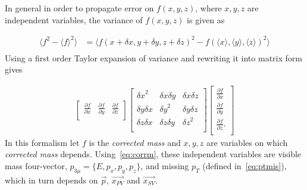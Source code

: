 In general in order to propagate error on $f(x,y,z)$, where $x,y,z$ are independent variables, the variance of $f(x,y,z)$ is given as

\begin{equation}
\begin{aligned}
	\langle f^{2}-\langle f \rangle^{2} \rangle  &=  \langle f(x+\delta x, y+\delta y, z+\delta z)^{2} - f(\langle x \rangle, \langle y \rangle, \langle z \rangle)^{2} \rangle \\
\end{aligned}
\end{equation}
Using a first order Taylor expansion of variance and rewriting it into matrix form gives

\begin{equation}
\begin{aligned}
       \begin{bmatrix}
		\frac{\partial{f}}{\partial{x}} & \frac{\partial{f}}{\partial{y}} & \frac{\partial{f}}{\partial{z}} \\
       \end{bmatrix}
       \begin{bmatrix}
	       {\delta x}^{2} & \delta x \delta y & \delta x \delta z  \\ 
	        \delta y \delta x & {\delta y}^{2} & \delta y \delta z  \\
	        \delta z \delta x & \delta z \delta y & {\delta z}^{2}  \\
       \end{bmatrix}
       \begin{bmatrix}
		\frac{\partial{f}}{\partial{x}} \\ \frac{\partial{f}}{\partial{y}} \\\frac{\partial{f}}{\partial{z}}. \\
       \end{bmatrix}
\end{aligned}
\end{equation}
In this formalism let $f$ is the \emph{corrected mass} and $x,y,z$ are variables on which \emph{corrected mass} depends. Using~\autoref{eq:corrm}, these independent variables are visible mass four-vector, $p_{3\mu}=\{E,p_{x},p_{y},p_{z}\}$, and missing $p_{T}$ (defined in~\autoref{eq:ptmis}), which in turn depends on $\vec{p}$, $\vec{x_{PV}}$ and $\vec{x_{SV}}$.


